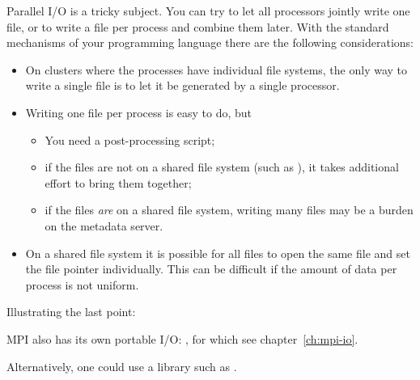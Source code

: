 
Parallel I/O is a tricky subject. You can try to let all processors
jointly write one file, or to write a file per process and combine
them later. With the standard mechanisms of your programming language
there are the following considerations:
\begin{itemize}
\item On clusters where the processes have individual file systems,
  the only way to write a single file is to let it be generated by a
  single processor.
\item Writing one file per process is easy to do, but
  \begin{itemize}
  \item You need a post-processing script;
  \item if the files are not on a shared file system (such as
    ), it takes additional effort to bring them
    together;
  \item if the files \emph{are} on a shared file system, writing many
    files may be a burden on the metadata server.
  \end{itemize}
\item On a shared file system it is possible for all files to open the
  same file and set the file pointer individually. This can be
  difficult if the amount of data per process is not uniform.
\end{itemize}
Illustrating the last point:
%

MPI also has its own portable I/O: , for which
see chapter~\ref{ch:mpi-io}.

Alternatively, one could use a library such as .

